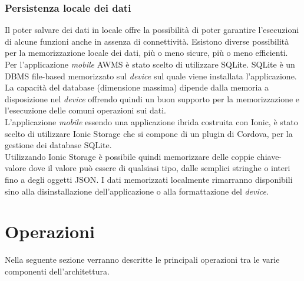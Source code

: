 \subsubsection{Persistenza locale dei dati}
Il poter salvare dei dati in locale offre la possibilità di poter garantire l'esecuzioni di alcune funzioni anche in assenza di connettività. Esistono diverse possibilità per la memorizzazione locale dei dati, più o meno sicure, più o meno efficienti.\\

Per l'applicazione \emph{mobile} \gls{AWMS} è stato scelto di utilizzare SQLite. SQLite è un \gls{DBMS}\ap{[g]} file-based memorizzato sul \emph{device} sul quale viene installata l'applicazione. La capacità del database (dimensione massima) dipende dalla memoria a disposizione nel \emph{device} offrendo quindi un buon supporto per la memorizzazione e l'esecuzione delle comuni operazioni sui dati.\\

L'applicazione \emph{mobile} essendo una \gls{applicazione ibrida}\ap{[g]} costruita con Ionic, è stato scelto di utilizzare Ionic Storage che si compone di un plugin di Cordova, per la gestione dei database SQLite.\\

Utilizzando Ionic Storage è possibile quindi memorizzare delle coppie chiave-valore dove il valore può essere di qualsiasi tipo,
dalle semplici stringhe o interi fino a degli oggetti \gls{JSON}\ap{[g]}. I dati memorizzati localmente rimarranno disponibili sino alla disinstallazione dell'applicazione o alla formattazione del \emph{device}.


\section{Operazioni}
Nella seguente sezione verranno descritte le principali operazioni tra le varie componenti dell'\gls{architettura}\ap{[g]}.
